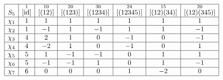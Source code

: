 \begin{exmp}{}
\begin{align*}
\begin{array}{|c|c|c|c|c|c|c|c|}
            \hline
            S_5    & \overset{1}{[\operatorname{id}]} & \overset{10}{[(12)]} & \overset{20}{[(123)]} & \overset{30}{[(1234)]} & \overset{24}{[(12345)]} & \overset{15}{[(12)(34)]} & \overset{20}{[(12)(345)]} \\ \hline
            \chi_1 & 1                  & 1                    & 1                     & 1                      & 1                       & 1                        & 1                         \\ \hline
            \chi_2 & 1                  & -1                   & 1                     & -1                     & 1                       & 1                        & -1                        \\ \hline
            \chi_3 & 4                  & 2                    & 1                     & 0                      & -1                      & 0                        & -1                        \\ \hline
            \chi_4 & 4                  & -2                   & 1                     & 0                      & -1                      & 0                        & 1                         \\ \hline
            \chi_5 & 5                  & 1                    & -1                    & -1                     & 0                       & 1                        & 1                         \\ \hline
            \chi_6 & 5                  & -1                   & -1                    & 1                      & 0                       & 1                        & -1                        \\ \hline
            \chi_7 & 6                  & 0                    & 0                     & 0                      & 1                       & -2                       & 0                         \\ \hline
        \end{array} 
    \end{align*}
\end{exmp}